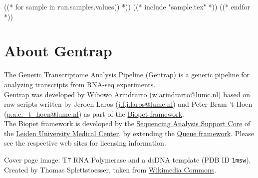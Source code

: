 \documentclass[a4paper,12pt]{article}
\begin{document}
((* for sample in run.samples.values() *))
((* include "sample.tex" *))
\clearpage
((* endfor *))


\part{About Gentrap}
\label{apx:about}

The Generic Transcriptome Analysis Pipeline (Gentrap) is a
generic pipeline for analyzing transcripts from RNA-seq experiments. \\

Gentrap was developed by Wibowo Arindrarto (\href{mailto:w.arindrarto@lumc.nl}{w.arindrarto@lumc.nl})
based on raw scripts written by Jeroen Laros
(\href{mailto:j.f.j.laros@lumc.nl}{j.f.j.laros@lumc.nl}) and
Peter-Bram 't Hoen
(\href{mailto:p.a.c._t_hoen@lumc.nl}{p.a.c._t_hoen@lumc.nl}) as part of the
\href{https://git.lumc/nl/biopet/biopet}{Biopet framework}. \\

The Biopet framework is developed by the
\href{http://sasc.lumc.nl}{Sequencing Analysis Support Core} of the
\href{http://lumc.nl}{Leiden University Medical Center}, by extending the
\href{http://http://gatkforums.broadinstitute.org/discussion/1306/overview-of-queue}{Queue framework}.
Please see the respective web sites for licensing information.

\indent

Cover page image: T7 RNA Polymerase and a dsDNA template (PDB ID \texttt{1msw}).
Created by Thomas Splettstoesser, taken from
\href{http://commons.wikimedia.org/wiki/File:T7_RNA_polymerase.jpg}{Wikimedia Commons}.
\end{document}
